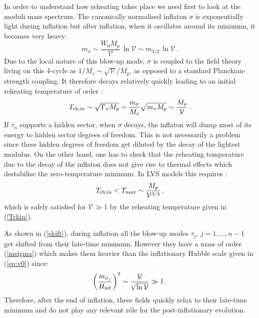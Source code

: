 \documentclass[11pt,a4paper]{article}
\newcommand{\be}{\begin{equation}}
\newcommand{\ee}{\end{equation}}
\newcommand\vo{{\mathcal{V}}}
\begin{document}
In order to understand how reheating takes place we need first to look at the moduli mass spectrum. The canonically normalised inflaton $\sigma$ is exponentially light during inflation but after inflation, when it oscillates around its minimum, it becomes very heavy:
\be
m_\sigma \sim \frac{W_0 M_p}{\vo}\,\ln\vo \sim  m_{3/2}\,\ln\vo\,.
\label{msigma}
\ee
Due to the local nature of this blow-up mode, $\sigma$ is coupled to the field theory living on this 4-cycle as $1/M_s \sim \sqrt{\vo}/M_p$, as opposed to a standard Planckian-strength coupling. It therefore decays relatively quickly leading to an initial reheating temperature of order \cite{Cicoli:2010ha}: 
\be
T_{\rm rh,in} \sim \sqrt{\Gamma_{\sigma} M_p} \sim \frac{m_\sigma}{M_s} \sqrt{m_\sigma M_p} \sim \frac{M_p}{\vo}\,.
\label{Trhin}
\ee
If $\tau_n$ supports a hidden sector, when $\sigma$ decays, the inflaton will dump most of its energy to hidden sector degrees of freedom. This is not necessarily a problem since these hidden degrees of freedom get diluted by the decay of the lightest modulus. On the other hand, one has to check that the reheating temperature due to the decay of the inflaton does not give rise to thermal effects which destabilise the zero-temperature minimum. In LVS models this requires \cite{Anguelova:2009ht}:
\be
T_{\rm rh,in} < T_{\rm max} \sim \frac{M_p}{\vo^{3/4}}\,,
\ee
which is safely satisfied for $\vo \gg 1$ by the reheating temperature given in (\ref{Trhin}).

As shown in (\ref{shift}), during inflation all the blow-up modes $\tau_j$, $j=1,...,n-1$ get shifted from their late-time minimum. However they have a mass of order (\ref{msigma}) which makes them heavier than the inflationary Hubble scale given in (\ref{eq:v0}) since:
\be
\left(\frac{ m_{\sigma_j}}{H_{\rm inf}}\right)^2 \sim \frac{\vo}{\sqrt{\ln\vo}} \gg 1\,.
\ee
Therefore, after the end of inflation, these fields quickly relax to their late-time minimum and do not play any relevant r\^ole for the post-inflationary evolution. 
\end{document}
